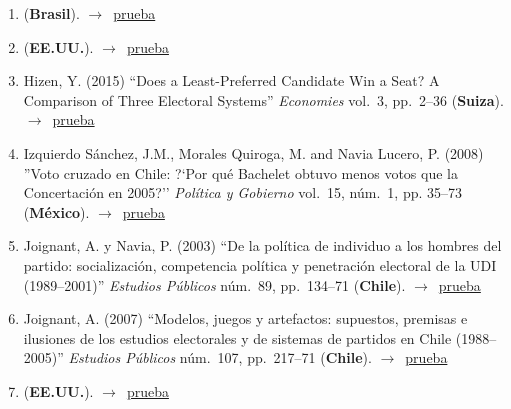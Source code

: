 \documentclass[12 pt, letter]{article}
\newenvironment{CitasMiTrabajo}{
    \begin{footnotesize}
    \begin{enumerate}[label={\footnotesize\emph{cita~\arabic*}},ref=\arabic*] %
        \setlength{\itemsep}{.1\itemsep}
        \setlength{\parskip}{.1\parskip}
    }{\end{enumerate}\end{footnotesize}}
\begin{document}
\begin{CitasMiTrabajo}
        \item {} (\textbf{Brasil}). $\rightarrow$~\href{https://periodicos.sbu.unicamp.br/ojs/index.php/op/article/view/8653390}{prueba}
        
        \item {} (\textbf{EE.UU.}). $\rightarrow$~\href{http://202.28.199.34/multim/3125836.pdf}{prueba}
          
        \item Hizen, Y. (2015)
        ``Does a Least-Preferred Candidate Win a Seat? A Comparison of Three Electoral Systems''
        \emph{Economies} vol.\ 3, pp.\ 2--36 (\textbf{Suiza}). $\rightarrow$~\href{https://github.com/emagar/cv/blob/master/citasMiTrab/mrs/hizenThreeSystems2015economies.pdf}{prueba}

        \item Izquierdo S\'anchez, J.M., Morales Quiroga, M. and Navia Lucero, P. (2008)
        ''Voto cruzado en Chile: ?`Por qu\'e Bachelet obtuvo menos votos que la Concertaci\'on en 2005?''
        \emph{Pol\'itica y Gobierno} vol.\ 15, n\'um.\ 1, pp. 35--73 (\textbf{M\'exico}). $\rightarrow$~\href{https://github.com/emagar/cv/blob/master/citasMiTrab/mrs/izquierdoetal2008pyg.pdf}{prueba}

        \item Joignant, A. y Navia, P. (2003)
        ``De la pol\'itica de individuo a los hombres del partido: socializaci\'on, competencia pol\'itica y penetraci\'on electoral
        de la UDI (1989--2001)'' \emph{Estudios P\'ublicos} n\'um.\ 89, pp.\ 134--71 (\textbf{Chile}). $\rightarrow$~\href{https://github.com/emagar/cv/blob/master/citasMiTrab/mrs/joigNavia.pdf}{prueba}

        \item Joignant, A. (2007)
        ``Modelos, juegos y artefactos: supuestos, premisas e ilusiones de los estudios electorales y de sistemas de partidos
        en Chile (1988--2005)'' \emph{Estudios P\'ublicos} n\'um.\ 107, pp.\ 217--71  (\textbf{Chile}). $\rightarrow$~\href{https://github.com/emagar/cv/blob/master/citasMiTrab/mrs/joignant07.pdf}{prueba}

      \item {} (\textbf{EE.UU.}). $\rightarrow$~\href{https://www.researchgate.net/profile/Patricio_Navia2/publication/289108699_Assessing_the_effectiveness_of_gender_quotas_in_open-list_proportional_representation_electoral_systems/links/5a3abb5da6fdcc7ffe63e778/Assessing-the-effectiveness-of-gender-quotas-in-open-list-proportional-representation-electoral-systems.pdf}{prueba}


\end{CitasMiTrabajo}
\end{document}
